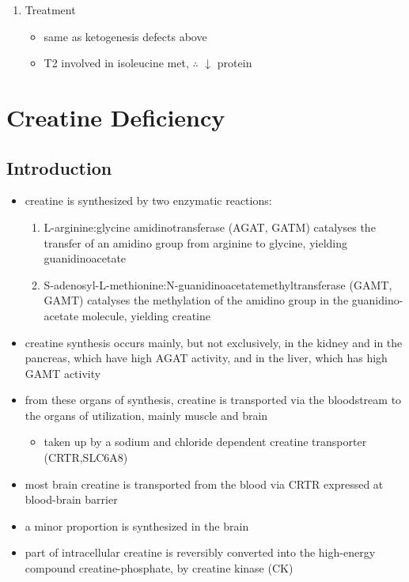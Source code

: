 \documentclass{scrartcl}
\begin{document}
\begin{enumerate}
\item Treatment
\label{sec:org0a5fdb4}
\begin{itemize}
\item same as ketogenesis defects above
\item T2 involved in isoleucine met, \(\therefore\) \(\downarrow\) protein
\end{itemize}
\end{enumerate}
\section{Creatine Deficiency}
\label{sec:org4a17b8d}
\subsection{Introduction}
\label{sec:org18cc332}
\begin{itemize}
\item creatine is synthesized by two enzymatic reactions:
\begin{enumerate}
\item L-arginine:glycine amidinotransferase (AGAT, GATM) catalyses the
transfer of an amidino group from arginine to glycine, yielding
guanidinoacetate
\item S-adenosyl-L-methionine:N-guanidinoacetatemethyltransferase
(GAMT, GAMT) catalyses the methylation of the amidino group in
the guanidino-acetate molecule, yielding creatine
\end{enumerate}

\item creatine synthesis occurs mainly, but not exclusively, in the kidney
and in the pancreas, which have high AGAT activity, and in the
liver, which has high GAMT activity

\item from these organs of synthesis, creatine is transported via the
bloodstream to the organs of utilization, mainly muscle and brain
\begin{itemize}
\item taken up by a sodium and chloride dependent creatine transporter
(CRTR,SLC6A8)
\end{itemize}

\item most brain creatine is transported from the blood via CRTR expressed
at blood-brain barrier
\item a minor proportion is synthesized in the brain

\item part of intracellular creatine is reversibly converted into the
high-energy compound creatine-phosphate, by creatine kinase (CK)


\end{itemize}
\end{document}

